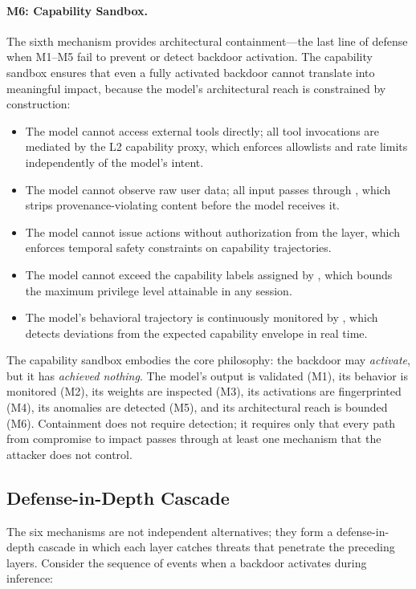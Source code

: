 \paragraph{M6: Capability Sandbox.}
The sixth mechanism provides architectural containment---the last line of
defense when M1--M5 fail to prevent or detect backdoor activation. The
capability sandbox ensures that even a fully activated backdoor cannot
translate into meaningful impact, because the model's architectural reach
is constrained by construction:

\begin{itemize}[leftmargin=*]
\item The model cannot access external tools directly; all tool invocations
      are mediated by the L2 capability proxy, which enforces allowlists
      and rate limits independently of the model's intent.
\item The model cannot observe raw user data; all input passes through
      \pasr, which strips provenance-violating content before the model
      receives it.
\item The model cannot issue actions without authorization from the \tsa
      layer, which enforces temporal safety constraints on capability
      trajectories.
\item The model cannot exceed the capability labels assigned by \cafl,
      which bounds the maximum privilege level attainable in any session.
\item The model's behavioral trajectory is continuously monitored by \gps,
      which detects deviations from the expected capability envelope in
      real time.
\end{itemize}

\noindent
The capability sandbox embodies the core \mire philosophy: the backdoor may
\emph{activate}, but it has \emph{achieved nothing}. The model's output is
validated (M1), its behavior is monitored (M2), its weights are inspected
(M3), its activations are fingerprinted (M4), its anomalies are detected
(M5), and its architectural reach is bounded (M6). Containment does not
require detection; it requires only that every path from compromise to
impact passes through at least one mechanism that the attacker does not
control.

\subsection{Defense-in-Depth Cascade}

The six mechanisms are not independent alternatives; they form a
defense-in-depth cascade in which each layer catches threats that
penetrate the preceding layers. Consider the sequence of events when a
backdoor activates during inference:

